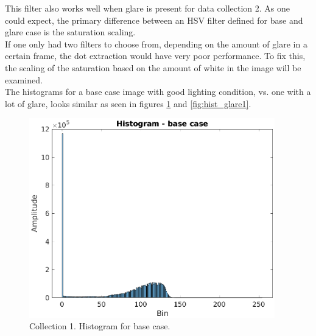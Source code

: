 \FloatBarrier


This filter also works well when glare is present for data collection 2. 
As one could expect, the primary difference between an HSV filter defined for base and glare case is the saturation scaling. \\
If one only had two filters to choose from, depending on the amount of glare in a certain frame, the dot extraction would have very poor performance. To fix this, the scaling of the saturation based on the amount of white in the image will be examined. \\

The histograms for a base case image with good lighting condition, vs. one with a lot of glare, looks similar as seen in figures \ref{fig:hist_base1} and \ref{fig:hist_glare1}. 
\begin{figure}[h!]
    \centering
    \begin{minipage}[t]{0.48\textwidth}
        \centering
        \includegraphics[width=0.95\textwidth]{figures/ImageAnalysis/Histogram_base1.eps}
        \caption{Collection 1. Histogram for base case.}
    \label{fig:hist_base1}
    \end{minipage}%
    \hspace{.03\textwidth}
    \begin{minipage}[t]{0.48\textwidth}
        \centering

\end{minipage}
\end{figure}

